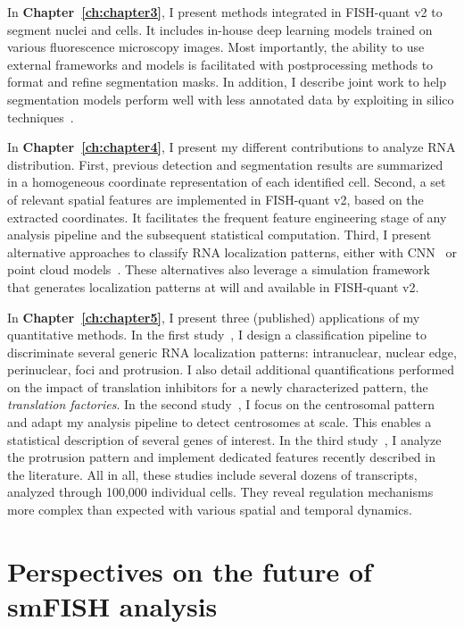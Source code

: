 In \textbf{Chapter~\ref{ch:chapter3}}, I present methods integrated in FISH-quant v2 to segment nuclei and cells.
It includes in-house deep learning models trained on various fluorescence microscopy images.
Most importantly, the ability to use external frameworks and models is facilitated with postprocessing methods to format and refine segmentation masks.
In addition, I describe joint work to help segmentation models perform well with less annotated data by exploiting in silico techniques~\cite{Bonte_2022}.

In \textbf{Chapter~\ref{ch:chapter4}}, I present my different contributions to analyze \ac{RNA} distribution.
First, previous detection and segmentation results are summarized in a homogeneous coordinate representation of each identified cell.
Second, a set of relevant spatial features are implemented in FISH-quant v2, based on the extracted coordinates.
It facilitates the frequent feature engineering stage of any analysis pipeline and the subsequent statistical computation.
Third, I present alternative approaches to classify \ac{RNA} localization patterns, either with \ac{CNN}~\cite{dubois_deep_2019} or point cloud models~\cite{pointfish_2022}.
These alternatives also leverage a simulation framework that generates localization patterns at will and available in FISH-quant v2.

In \textbf{Chapter~\ref{ch:chapter5}}, I present three (published) applications of my quantitative methods.
In the first study~\cite{CHOUAIB_2020}, I design a classification pipeline to discriminate several generic \ac{RNA} localization patterns: intranuclear, nuclear edge, perinuclear, foci and protrusion.
I also detail additional quantifications performed on the impact of translation inhibitors for a newly characterized pattern, the \emph{translation factories}.
In the second study~\cite{safieddine_choreography_2021}, I focus on the centrosomal pattern and adapt my analysis pipeline to detect centrosomes at scale.
This enables a statistical description of several genes of interest.
In the third study~\cite{pichon_kinesin_2021}, I analyze the protrusion pattern and implement dedicated features recently described in the literature.
All in all, these studies include several dozens of transcripts, analyzed through 100,000 individual cells.
They reveal regulation mechanisms more complex than expected with various spatial and temporal dynamics.

\section{Perspectives on the future of smFISH analysis}
\label{sec:conclusion_future}


